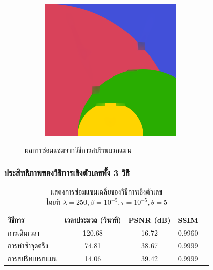 \documentclass[xcolor=dvipsnames, xetex,serif]{beamer}
\numberwithin{equation}{section}
\begin{document}
\begin{frame}
\begin{figure}[H]
\begin{subfigure}{0.15\linewidth}
            \end{subfigure}
            \begin{subfigure}{0.15\linewidth}
                \centering
                \includegraphics[width=0.9\linewidth]{images/result_ex1/splitbergman05.png}
            \end{subfigure}
            \caption{ผลการซ่อมแซมจากวิธีการสปริทเบรกแมน}
        \end{figure}
    \end{frame}
	\begin{frame}
		\frametitle{ประสิทธิภาพของวิธีการเชิงตัวเลขทั้ง 3 วิธี}
		\begin{table}[H]
		\centering
		\captionsetup{justification=centering}
			\begin{tabular}[ht]{|l|c|c|c|c|}
				\hline
				วิธีการ  & เวลาประมวล  (วินาที) & PSNR (dB) & SSIM \\
				\hline
				การเดินเวลา & 120.68 & 16.72 & 0.9960 \\
				การทำซ้ำจุดตรึง & 74.81 & 38.67 & 0.9999 \\
				การสปริทเบรกแมน & 14.06 & 39.42 & 0.9999  \\
				\hline
			\end{tabular}
		\caption{แสดงการซ่อมแซมเฉลี่ยของวิธีการเชิงตัวเลข \\ โดยที่ $\lambda = 250, \beta = 10^{-5}, \tau = 10^{-5}, \theta = 5 $}
		\end{table}	
	\end{frame}
\end{document}
